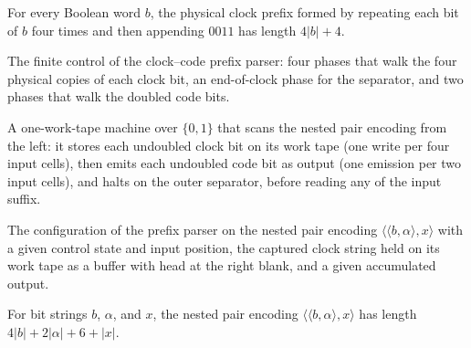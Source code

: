 \begin{lemma}
\label{Turing.timedClockPrefix_length}
\leanok
{}
For every Boolean word $b$, the physical clock prefix formed by repeating each bit of
$b$ four times and then appending $0011$ has length $4|b|+4$.
\end{lemma}

\begin{definition}
\label{Turing.TimedPrefixControl}
\leanok
The finite control of the clock--code prefix parser: four phases that walk the
four physical copies of each clock bit, an end-of-clock phase for the
separator, and two phases that walk the doubled code bits.
\end{definition}

\begin{definition}
\label{Turing.timedPrefixTM}
\leanok
{}
A one-work-tape machine over $\{0,1\}$ that scans the nested pair encoding
from the left: it stores each undoubled clock bit on its work tape (one write
per four input cells), then emits each undoubled code bit as output (one
emission per two input cells), and halts on the outer separator, before
reading any of the input suffix.
\end{definition}

\begin{definition}
\label{Turing.timedPrefixCfg}
\leanok
{}
The configuration of the prefix parser on the nested pair encoding
$\langle \langle b, \alpha\rangle, x\rangle$ with a given control state and
input position, the captured clock string held on its work tape as a buffer
with head at the right blank, and a given accumulated output.
\end{definition}

\begin{lemma}
\label{Turing.timed_input_length}
\leanok
{}
For bit strings $b$, $\alpha$, and $x$, the nested pair encoding $\langle\langle
b,\alpha\rangle,x\rangle$ has length $4|b|+2|\alpha|+6+|x|$.
\end{lemma}

